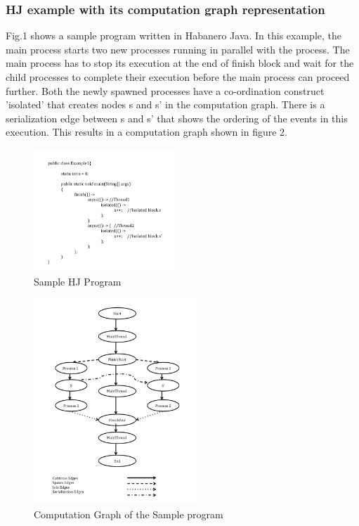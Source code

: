 \subsubsection{HJ example with its computation graph representation}
Fig.1 shows a sample program written in Habanero Java. In this example, the main process starts two new processes running in parallel with the process. The main process has to stop its execution at the end of finish block and wait for the child processes to complete their execution before the main process can proceed further. Both the newly spawned processes have a co-ordination construct 'isolated' that creates nodes s and s' in the computation graph. There is a serialization edge between s and s' that shows the ordering of the events in this execution. This results in a computation graph shown in figure 2. 

\begin{figure}[H]
  \centering
    \includegraphics[width=0.47\textwidth]{../figs/Fig1.jpg}
     \caption{Sample HJ Program}
\end{figure}
\begin{figure}[H]
  \centering
    \includegraphics[width=0.55\textwidth]{../figs/Fig2.jpg}
    \caption{Computation Graph of the Sample program}
\end{figure}

